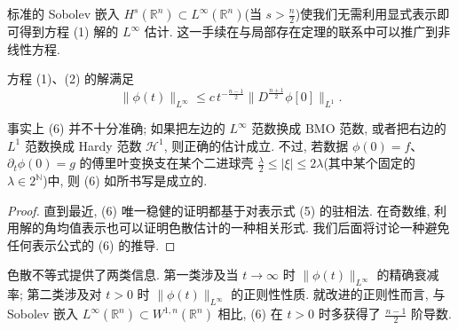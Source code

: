 \begin{remark}\label{rem:1.2}
标准的 Sobolev 嵌入 $H^s(\mathbb{R}^n) \subset L^\infty(\mathbb{R}^n)$(当 $s > \frac{n}{2}$)使我们无需利用显式表示即可得到方程 (1) 解的 $L^\infty$ 估计. 这一手续在与局部存在定理的联系中可以推广到非线性方程.\end{remark}

\begin{proposition}[色散不等式]\label{prop:1.3}
方程 (1)、(2) 的解满足
\begin{equation}
\|\phi(t)\|_{L^{\infty}}\leq c\,t^{-\frac{n-1}{2}}\|D^{\frac{n+1}{2}}\phi[0]\|_{L^{1}}.\end{equation}
\end{proposition}

\begin{remark}\label{rem:1.4}
事实上 (6) 并不十分准确; 如果把左边的 $L^\infty$ 范数换成 $\mathrm{BMO}$ 范数, 或者把右边的 $L^1$ 范数换成 Hardy 范数 $\mathcal{H}^1$, 则正确的估计成立. 不过, 若数据 $\phi(0) = f$、$\partial_t \phi(0) = g$ 的傅里叶变换支在某个二进球壳 $\frac{\lambda}{2} \leq |\xi| \leq 2\lambda$(其中某个固定的 $\lambda \in 2^{\mathbb{N}}$)中, 则 (6) 如所书写是成立的.\end{remark}

\begin{proof}
直到最近, (6) 唯一稳健的证明都基于对表示式 (5) 的驻相法. 在奇数维, 利用解的角均值表示也可以证明色散估计的一种相关形式. 我们后面将讨论一种避免任何表示公式的 (6) 的推导.\end{proof}

\begin{remark}\label{rem:1.5}
色散不等式提供了两类信息. 第一类涉及当 $t \to \infty$ 时 $\|\phi(t)\|_{L^\infty}$ 的精确衰减率; 第二类涉及对 $t > 0$ 时 $\|\phi(t)\|_{L^\infty}$ 的正则性性质. 就改进的正则性而言, 与 Sobolev 嵌入 $L^\infty(\mathbb{R}^n) \subset W^{1,n}(\mathbb{R}^n)$ 相比, (6) 在 $t > 0$ 时多获得了 $\frac{n-1}{2}$ 阶导数.\end{remark}

